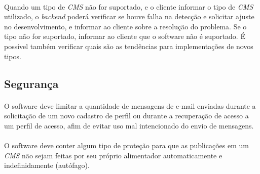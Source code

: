 \documentclass[a4paper,12pt]{article}
\def\cms{\emph{CMS}}
\begin{document}
\paragraph{}
Quando um tipo de \cms{} não for suportado, e o cliente informar o tipo de
\cms{} utilizado, o \emph{backend} poderá verificar se houve falha na detecção
e solicitar ajuste no desenvolvimento, e informar ao cliente sobre a resolução
do problema. Se o tipo não for suportado, informar ao cliente que o software
não é suportado. É possível também verificar quais são as tendências para
implementações de novos tipos.

\subsection{Segurança}

\paragraph{}
O software deve limitar a quantidade de mensagens de e-mail enviadas durante a
solicitação de um novo cadastro de perfil ou durante a recuperação de acesso a
um perfil de acesso, afim de evitar uso mal intencionado do envio de mensagens.

\paragraph{}
O software deve conter algum tipo de proteção para que as publicações em um
\cms{} não sejam feitas por seu próprio alimentador automaticamente e
indefinidamente (autófago).
\end{document}
